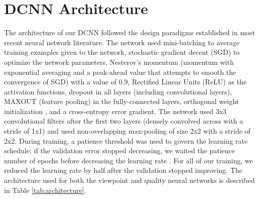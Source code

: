 \section{DCNN Architecture}
The architecture of our DCNN followed the design paradigms established in most recent neural network literature.  The network used mini-batching \cite{hinton_fast_2006} to average training examples given to the network, stochastic gradient decent (SGD) \cite{gardner_learning_1984, tsitsiklis_distributed_1986} to optimize the network parameters, Nesterov's momentum \cite{nesterov_method_1983} (momentum with exponential averaging and a peak-ahead value that attempts to smooth the convergence of SGD) with a value of 0.9, Rectified Linear Units (ReLU) \cite{dahl_improving_2013, krizhevsky_imagenet_2012, nair_rectified_2010} as the activation functions, dropout \cite{hinton_improving_2012} in all layers (including convolutional layers), MAXOUT \cite{goodfellow_maxout_2013} (feature pooling) in the fully-connected layers, orthogonal weight initialization \cite{saxe_exact_2013}, and a cross-entropy error gradient.  The network used 3x3 convolutional filters after the first two layers (densely convolved across with a stride of 1x1) and used non-overlapping max-pooling of size 2x2 with a stride of 2x2.  During training, a patience threshold was used to govern the learning rate schedule; if the validation error stopped decreasing, we waited the patience number of epochs before decreasing the learning rate \cite{fahlman_cascade-correlation_1990}.  For all of our training, we reduced the learning rate by half after the validation stopped improving.  The architecture used for both the viewpoint and quality neural networks is described in Table \ref{tab:architecture}.

